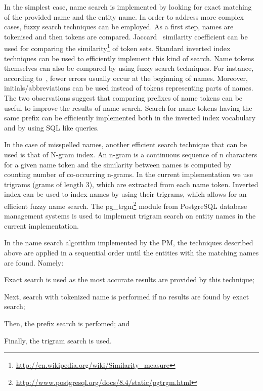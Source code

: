 In the simplest case, name search is implemented by looking for exact matching of the provided name and the entity name. In order to address more complex cases, fuzzy search techniques can be employed. As a first step, names are tokenised and then tokens are compared. Jaccard~\cite{Bilenko:2003pd} similarity coefficient can be used for comparing the similarity\footnote{\url{http://en.wikipedia.org/wiki/Similarity_measure}} of token sets. Standard inverted index techniques can be used to efficiently implement this kind of search. Name tokens themselves can also be compared by using fuzzy search techniques. For instance, according to~\cite{Pollock:1984rr}, fewer errors usually occur at the beginning of names. Moreover, initials/abbreviations can be used instead of tokens representing parts of names. The two observations suggest that comparing prefixes of name tokens can be useful to improve the results of name search. Search for name tokens having the same prefix can be efficiently implemented both in the inverted index vocabulary and by using SQL like queries.\

In the case of misspelled names, another efficient search technique that can be used is that of N-gram index. An n-gram is a continuous sequence of n characters for a given name token and the similarity between names is computed by counting number of co-occurring n-grams. In the current implementation we use trigrams (grams of length 3), which are extracted from each name token. Inverted index can be used to index names by using their trigrams, which allows for an efficient fuzzy name search. The pg\_trgm\footnote{\url{http://www.postgresql.org/docs/8.4/static/pgtrgm.html}}  module from PostgreSQL database management systems is used to implement trigram search on entity names in the current implementation. 

In the name search algorithm implemented by the PM, the techniques described above are applied in a sequential order until the entities with the matching names are found. Namely: 
\begin{inparaenum}[(i)]
\item Exact search is used as the most accurate results are provided by this technique; 
\item Next, search with tokenized name is performed if no results are found by exact search; 
\item Then, the prefix search is perfomed; and 
\item Finally, the trigram search is used.
\end{inparaenum}


